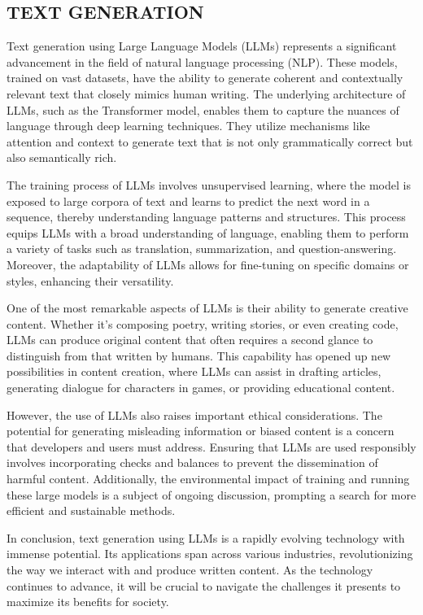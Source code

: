 \begin{spacing}{1.5}
\begin{sloppypar}
\section{TEXT GENERATION}



Text generation using Large Language Models (LLMs) represents a significant advancement in the field of natural language processing (NLP). These models, trained on vast datasets, have the ability to generate coherent and contextually relevant text that closely mimics human writing. The underlying architecture of LLMs, such as the Transformer model, enables them to capture the nuances of language through deep learning techniques. They utilize mechanisms like attention and context to generate text that is not only grammatically correct but also semantically rich.

The training process of LLMs involves unsupervised learning, where the model is exposed to large corpora of text and learns to predict the next word in a sequence, thereby understanding language patterns and structures. This process equips LLMs with a broad understanding of language, enabling them to perform a variety of tasks such as translation, summarization, and question-answering. Moreover, the adaptability of LLMs allows for fine-tuning on specific domains or styles, enhancing their versatility.

One of the most remarkable aspects of LLMs is their ability to generate creative content. Whether it's composing poetry, writing stories, or even creating code, LLMs can produce original content that often requires a second glance to distinguish from that written by humans. This capability has opened up new possibilities in content creation, where LLMs can assist in drafting articles, generating dialogue for characters in games, or providing educational content.

However, the use of LLMs also raises important ethical considerations. The potential for generating misleading information or biased content is a concern that developers and users must address. Ensuring that LLMs are used responsibly involves incorporating checks and balances to prevent the dissemination of harmful content. Additionally, the environmental impact of training and running these large models is a subject of ongoing discussion, prompting a search for more efficient and sustainable methods.

In conclusion, text generation using LLMs is a rapidly evolving technology with immense potential. Its applications span across various industries, revolutionizing the way we interact with and produce written content. As the technology continues to advance, it will be crucial to navigate the challenges it presents to maximize its benefits for society.


\end{sloppypar}
\end{spacing}
